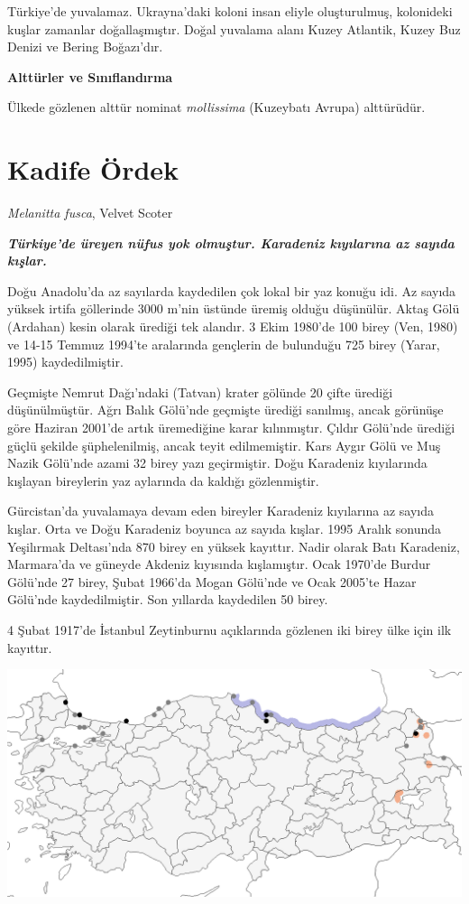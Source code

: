 \documentclass[
  a4paper,
  DIV=11,
  numbers=noendperiod]{scrartcl}
\begin{document}
Türkiye'de yuvalamaz. Ukrayna'daki koloni insan eliyle oluşturulmuş,
kolonideki kuşlar zamanlar doğallaşmıştır. Doğal yuvalama alanı Kuzey
Atlantik, Kuzey Buz Denizi ve Bering Boğazı'dır.

\textbf{Alttürler ve Sınıflandırma}

Ülkede gözlenen alttür nominat \emph{mollissima} (Kuzeybatı Avrupa)
alttürüdür.

\section{Kadife Ördek}\label{kadife-uxf6rdek}

\emph{Melanitta fusca}, Velvet Scoter

\textbf{\emph{Türkiye'de üreyen nüfus yok olmuştur. Karadeniz kıyılarına
az sayıda kışlar.}}

Doğu Anadolu'da az sayılarda kaydedilen çok lokal bir yaz konuğu idi. Az
sayıda yüksek irtifa göllerinde 3000 m'nin üstünde üremiş olduğu
düşünülür. Aktaş Gölü (Ardahan) kesin olarak ürediği tek alandır. 3 Ekim
1980'de 100 birey (Ven, 1980) ve 14-15 Temmuz 1994'te aralarında
gençlerin de bulunduğu 725 birey (Yarar, 1995) kaydedilmiştir.

Geçmişte Nemrut Dağı'ndaki (Tatvan) krater gölünde 20 çifte ürediği
düşünülmüştür. Ağrı Balık Gölü'nde geçmişte ürediği sanılmış, ancak
görünüşe göre Haziran 2001'de artık üremediğine karar kılınmıştır.
Çıldır Gölü'nde ürediği güçlü şekilde şüphelenilmiş, ancak teyit
edilmemiştir. Kars Aygır Gölü ve Muş Nazik Gölü'nde azami 32 birey yazı
geçirmiştir. Doğu Karadeniz kıyılarında kışlayan bireylerin yaz
aylarında da kaldığı gözlenmiştir.

Gürcistan'da yuvalamaya devam eden bireyler Karadeniz kıyılarına az
sayıda kışlar. Orta ve Doğu Karadeniz boyunca az sayıda kışlar. 1995
Aralık sonunda Yeşilırmak Deltası'nda 870 birey en yüksek kayıttır.
Nadir olarak Batı Karadeniz, Marmara'da ve güneyde Akdeniz kıyısında
kışlamıştır. Ocak 1970'de Burdur Gölü'nde 27 birey, Şubat 1966'da Mogan
Gölü'nde ve Ocak 2005'te Hazar Gölü'nde kaydedilmiştir. Son yıllarda
kaydedilen 50 birey.

4 Şubat 1917'de İstanbul Zeytinburnu açıklarında gözlenen iki birey ülke
için ilk kayıttır.

\includegraphics{images/harita_Melanitta fusca.png}
\end{document}
